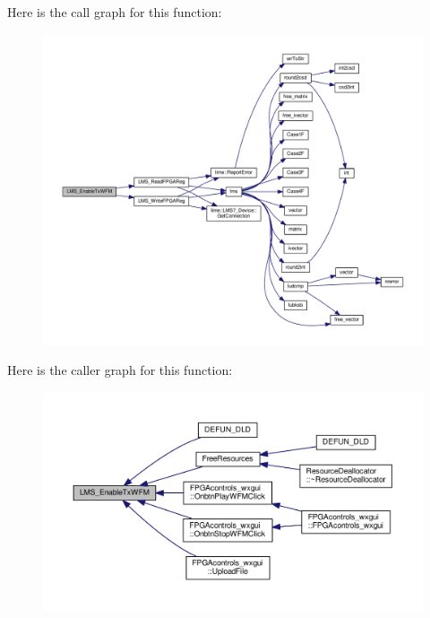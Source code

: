 Here is the call graph for this function\+:
\nopagebreak
\begin{figure}[H]
\begin{center}
\leavevmode
\includegraphics[width=350pt]{df/de1/lms7__api_8cpp_abd52e9c4a89706ff53c3c59894f1b932_cgraph}
\end{center}
\end{figure}




Here is the caller graph for this function\+:
\nopagebreak
\begin{figure}[H]
\begin{center}
\leavevmode
\includegraphics[width=350pt]{df/de1/lms7__api_8cpp_abd52e9c4a89706ff53c3c59894f1b932_icgraph}
\end{center}
\end{figure}


